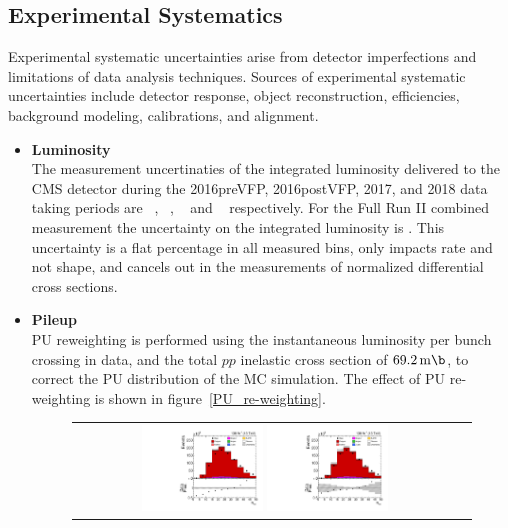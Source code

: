 \subsection{Experimental Systematics}
\label{Experimental_Systematics}
Experimental systematic uncertainties arise from detector imperfections and limitations of data analysis techniques.
Sources of experimental systematic uncertainties include detector response, object reconstruction, efficiencies, background modeling, calibrations, and alignment.
\begin{itemize}
    \item {\bf Luminosity} \\
    The measurement uncertinaties of the integrated luminosity delivered to the CMS detector during the 2016preVFP, 2016postVFP, 2017, and 2018 data taking periods are \lumierrSixPreVFP~\cite{bib:lumipas16}, \lumierrSixPostVFP~\cite{bib:lumipas16}, \lumierrSeven~\cite{bib:lumipas17} and \lumierrEight~\cite{bib:lumipas18} respectively. 
    For the Full Run II combined measurement the uncertainty on the integrated luminosity is \lumierrRuniiUL.
    This uncertainty is a flat percentage in all measured bins, only impacts rate and not shape, and cancels out in the measurements of normalized differential cross sections.
    \item {\bf Pileup} \\
    PU reweighting is performed using the instantaneous luminosity per bunch crossing in data, and the total $pp$ inelastic cross section of $\SI{69.2}{\m \b}$, to correct the PU distribution of the MC simulation.
    The effect of PU re-weighting is shown in figure~\ref{PU_re-weighting}.
    \begin{figure}[htb]
    \begin{center}
        \begin{tabular}{cc}
            \includegraphics[width=0.325\textwidth]{fig_fullRun2UL/controlplots/combined/vertMulti_noPU_step8.pdf}
            \includegraphics[width=0.325\textwidth]{fig_fullRun2UL/controlplots/combined/vertMulti_step8.pdf}

\end{tabular}
\end{center}
\end{figure}
\end{itemize}
